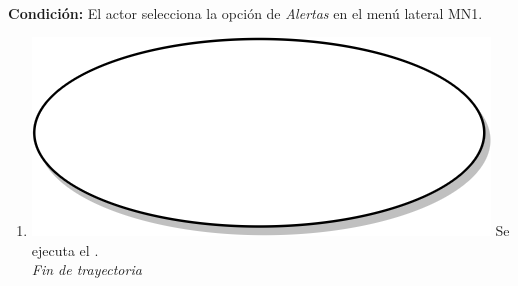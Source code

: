 \textbf{} \\
\textbf{Condición:} El actor selecciona la opción de \textit{Alertas} en el menú lateral MN1. \\
 \begin{enumerate}[label=O\arabic*]
    \item {\includegraphics[scale=.05]{Capitulo3/img/proceso.png} Se ejecuta el \textbf{}.} \\
    \textit{Fin de trayectoria} \\
\end{enumerate}